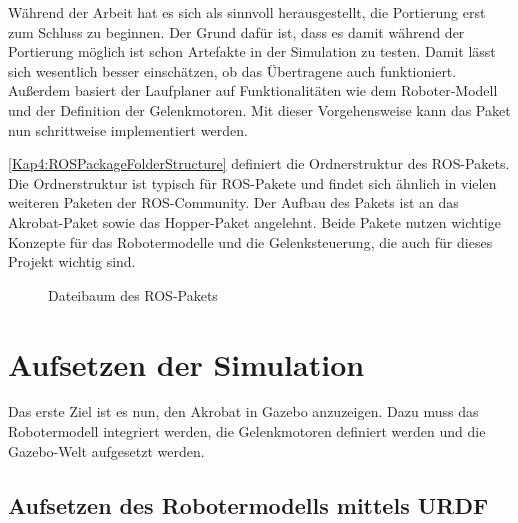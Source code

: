 \begin{itemize}
Während der Arbeit hat es sich als sinnvoll herausgestellt, die Portierung erst zum Schluss zu beginnen. Der Grund dafür ist, dass es damit während der Portierung möglich ist schon Artefakte in der Simulation zu testen. Damit lässt sich wesentlich besser einschätzen, ob das Übertragene auch funktioniert. Außerdem basiert der Laufplaner auf Funktionalitäten wie dem Roboter-Modell und der Definition der Gelenkmotoren. Mit dieser Vorgehensweise kann das Paket nun schrittweise implementiert werden.

\autoref{Kap4:ROSPackageFolderStructure} definiert die Ordnerstruktur des \ac{ROS}-Pakets. Die Ordnerstruktur ist typisch für \ac{ROS}-Pakete und findet sich ähnlich in vielen weiteren Paketen der \ac{ROS}-Community. Der Aufbau des Pakets ist an das Akrobat-Paket \autocite{akrobat} sowie das Hopper-Paket \autocite{hopper} angelehnt. Beide Pakete nutzen wichtige Konzepte für das Robotermodelle und die Gelenksteuerung, die auch für dieses Projekt wichtig sind.

\begin{figure}[p!]
\caption{Dateibaum des ROS-Pakets}
\label{Kap4:ROSPackageFolderStructure}
\end{figure}

\section{Aufsetzen der Simulation}

Das erste Ziel ist es nun, den Akrobat in Gazebo anzuzeigen. Dazu muss das Robotermodell integriert werden, die Gelenkmotoren definiert werden und die Gazebo-Welt aufgesetzt werden.

\subsection{Aufsetzen des Robotermodells mittels \ac{URDF}}


\end{itemize}
